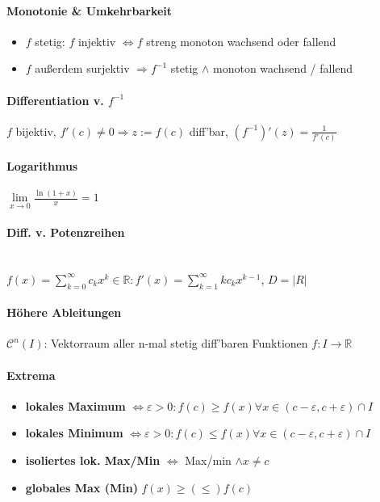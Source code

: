 \documentclass[paper=a3,paper=landscape, fontsize=9pt, DIV=30]{scrartcl}
\newcommand{\real}{{\mathbb{R}}}
\begin{document}
\begin{multicols*}{4}
  \paragraph{Monotonie \& Umkehrbarkeit}
  \begin{itemize}
  \item $f$ stetig: $f$ injektiv $\Leftrightarrow f$ streng monoton wachsend oder fallend
  \item $f$ außerdem surjektiv $\Rightarrow f^{-1}$ stetig $\wedge$ monoton wachsend / fallend
  \end{itemize}


  \paragraph{Differentiation v. $f^{-1}$}
  $f$ bijektiv, $f'(c) \neq 0 \Rightarrow z := f(c)$ diff'bar, $(f^{-1})'(z)=\frac{1}{f'(c)}$


  \paragraph{Logarithmus}
  $\lim\limits_{x\rightarrow0} \frac{\ln(1+x)}{x}=1$


  \paragraph{Diff. v. Potenzreihen}\hspace{0pt}\\
  $ f(x)=\sum_{k=0}^{\infty}c_kx^k \in \real: f'(x)=\sum_{k=1}^{\infty}kc_kx^{k-1}$, $D = \lvert R \rvert$


  \paragraph{Höhere Ableitungen}
  $\mathscr{C}^n(I)$: Vektorraum aller n-mal stetig diff'baren Funktionen $f: I \rightarrow \real$


  \paragraph{Extrema}
  \begin{itemize}
  \item \textbf{lokales Maximum} $\Leftrightarrow \varepsilon > 0: f(c) \geq f(x) \forall x \in (c-\varepsilon,c+\varepsilon)\cap I$
  \item \textbf{lokales Minimum} $\Leftrightarrow \varepsilon > 0: f(c) \leq f(x) \forall x \in (c-\varepsilon,c+\varepsilon)\cap I$
  \item \textbf{isoliertes lok. Max/Min} $\Leftrightarrow$ Max/min $\wedge x \neq c$
  \item \textbf{globales Max (Min)} $f(x) \geq (\leq) f(c)$
  \end{itemize}



\end{multicols*}
\end{document}
